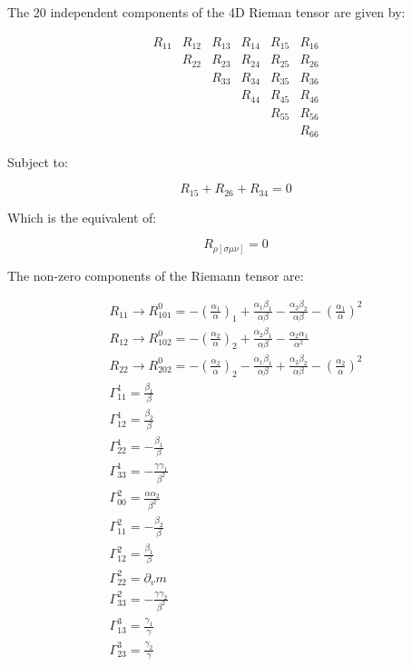 \documentclass{article}
\begin{document}
The 20 independent components of the 4D Rieman tensor are given by:
\begin{center}
\begin{equation}
\begin{array}{cccccc}
R_{11} & R_{12} & R_{13} & R_{14} & R_{15} & R_{16} \\ & R_{22} & R_{23} & R_{24} & R_{25} & R_{26} \\ & & R_{33} & R_{34} & R_{35} & R_{36} \\ & & & R_{44} & R_{45} & R_{46} \\ & & & & R_{55} & R_{56} \\ & & & & & R_{66}
\end{array}
\end{equation}
\end{center}
Subject to:
\begin{center}
\begin{equation}
R_{15} + R_{26} + R_{34} = 0
\end{equation}
\end{center}
Which is the equivalent of:
\begin{center}
\begin{equation}
R_{\rho[\sigma\mu\nu]}=0
\end{equation}
\end{center}
The non-zero components of the Riemann tensor are:
\begin{center}
\begin{equation}
\begin{array}{c}
R_{11}\rightarrow R_{101}^{0}=-\left(\frac{\alpha_{1}}{\alpha}\right)_{1}+\frac{\alpha_{1}\beta_{1}}{\alpha\beta}-\frac{\alpha_{2}\beta_{2}}{\alpha\beta}-\left(\frac{\alpha_{1}}{\alpha}\right)^{2}\\
R_{12}\rightarrow R_{102}^{0}=-\left(\frac{\alpha_{2}}{\alpha}\right)_{2}+\frac{\alpha_{2}\beta_{1}}{\alpha\beta}-\frac{\alpha_{2}\alpha_{1}}{\alpha^{2}}\\
R_{22}\rightarrow R_{202}^{0}=-\left(\frac{\alpha_{2}}{\alpha}\right)_{2}-\frac{\alpha_{1}\beta_{1}}{\alpha\beta}+\frac{\alpha_{2}\beta_{2}}{\alpha\beta}-\left(\frac{\alpha_{2}}{\alpha}\right)^{2}\\
\Gamma_{11}^{1}=\frac{\beta_{1}}{\beta}\\
\Gamma_{12}^{1}=\frac{\beta_{2}}{\beta}\\
\Gamma_{22}^{1}=-\frac{\beta_{1}}{\beta}\\
\Gamma_{33}^{1}=-\frac{\gamma\gamma_{1}}{\beta^{2}}\\
\Gamma_{00}^{2}=\frac{\alpha\alpha_{2}}{\beta^{2}}\\
\Gamma_{11}^{2}=-\frac{\beta_{2}}{\beta}\\
\Gamma_{12}^{2}=\frac{\beta_{1}}{\beta}\\ 
\Gamma_{22}^{2}=\partial_{v}m\\
\Gamma_{33}^{2}=-\frac{\gamma\gamma_{2}}{\beta^{2}}\\
\Gamma_{13}^{3}=\frac{\gamma_{1}}{\gamma}\\
\Gamma_{23}^{3}=\frac{\gamma_{2}}{\gamma}\\
\end{array}
\end{equation}
\end{center}
\end{document}
